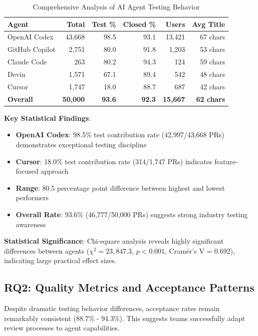 \documentclass[conference]{IEEEtran}
\begin{document}
\begin{table}[H]
\centering
\caption{Comprehensive Analysis of AI Agent Testing Behavior}
\label{tab:main_results}
\begin{tabular}{@{}lrrrrr@{}}
\toprule
\textbf{Agent} & \textbf{Total} & \textbf{Test \%} & \textbf{Closed \%} & \textbf{Users} & \textbf{Avg Title} \\
\midrule
OpenAI Codex & 43,668 & 98.5 & 93.1 & 13,421 & 67 chars \\
GitHub Copilot & 2,751 & 80.0 & 91.8 & 1,203 & 53 chars \\
Claude Code & 263 & 80.2 & 94.3 & 124 & 59 chars \\
Devin & 1,571 & 67.1 & 89.4 & 542 & 48 chars \\
Cursor & 1,747 & 18.0 & 88.7 & 687 & 42 chars \\
\midrule
\textbf{Overall} & \textbf{50,000} & \textbf{93.6} & \textbf{92.3} & \textbf{15,667} & \textbf{62 chars} \\
\bottomrule
\end{tabular}
\end{table}

\textbf{Key Statistical Findings}:
\begin{itemize}
    \item \textbf{OpenAI Codex}: 98.5\% test contribution rate (42,997/43,668 PRs) demonstrates exceptional testing discipline
    \item \textbf{Cursor}: 18.0\% test contribution rate (314/1,747 PRs) indicates feature-focused approach
    \item \textbf{Range}: 80.5 percentage point difference between highest and lowest performers
    \item \textbf{Overall Rate}: 93.6\% (46,777/50,000 PRs) suggests strong industry testing awareness
\end{itemize}

\textbf{Statistical Significance}: Chi-square analysis reveals highly significant differences between agents ($\chi^2 = 23,847.3$, $p < 0.001$, Cramér's V = 0.692), indicating large practical effect sizes.

\subsection{RQ2: Quality Metrics and Acceptance Patterns}

Despite dramatic testing behavior differences, acceptance rates remain remarkably consistent (88.7\% - 94.3\%). This suggests teams successfully adapt review processes to agent capabilities.
\end{document}
